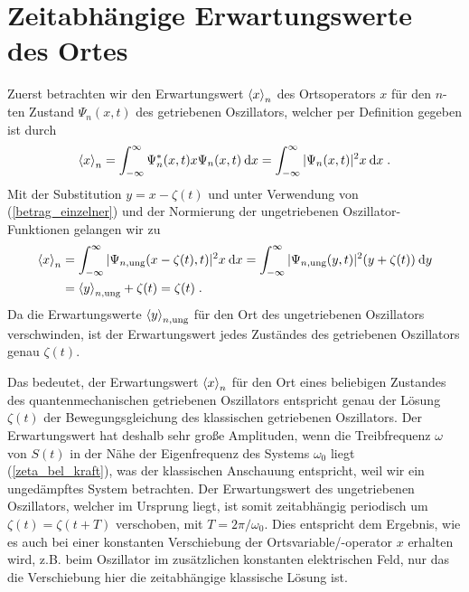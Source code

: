   \section{Zeitabhängige Erwartungswerte des Ortes}
    Zuerst betrachten wir den Erwartungswert $\braket{x}_n$ des Ortsoperators $x$ für den $n$-ten Zustand $\Psi_n(x,t)$ des getriebenen Oszillators, welcher per Definition gegeben ist durch
    \begin{equation}
      \braket{x}_n = \int_{-\infty}^{\infty} \Psi_n^*(x,t)x\Psi_n(x,t) \: \text dx
      = \int_{-\infty}^{\infty} |\Psi_n(x,t)|^2 x \: \text dx \; .
    \end{equation}
    Mit der Substitution $y=x-\zeta(t)$ und unter Verwendung von (\ref{betrag_einzelner}) und der Normierung der ungetriebenen Oszillator-Funktionen gelangen wir zu
    \begin{align}
      \begin{split}
        \braket{x}_n &= \int_{-\infty}^{\infty} |\Psi_{n,\text{ung}}(x-\zeta(t),t)|^2 x \: \text dx
        = \int_{-\infty}^{\infty} |\Psi_{n,\text{ung}}(y,t)|^2 (y+\zeta(t)) \: \text dy \\
        &= \braket{y}_{n,\text{ung}} + \zeta(t) = \zeta(t) \; .
        \label{erwartungswert_x_einzelner}
      \end{split}
    \end{align}
    Da die Erwartungswerte $\braket{y}_{n,\text{ung}}$ für den Ort des ungetriebenen Oszillators verschwinden, ist der Erwartungswert jedes Zuständes des getriebenen Oszillators genau $\zeta(t)$.

    Das bedeutet, der Erwartungswert $\braket{x}_n$ für den Ort eines beliebigen Zustandes des quantenmechanischen getriebenen Oszillators entspricht genau der Lösung $\zeta(t)$ der Bewegungsgleichung des klassischen getriebenen Oszillators.
    Der Erwartungswert hat deshalb sehr große Amplituden, wenn die Treibfrequenz $\omega$ von $S(t)$ in der Nähe der Eigenfrequenz des Systems $\omega_0$ liegt (\ref{zeta_bel_kraft}), was der klassischen Anschauung entspricht, weil wir ein ungedämpftes System betrachten.
    Der Erwartungswert des ungetriebenen Oszillators, welcher im Ursprung liegt, ist somit zeitabhängig periodisch um $\zeta(t)=\zeta(t+T)$ verschoben, mit $T=2\pi/\omega_0$.
    Dies entspricht dem Ergebnis, wie es auch bei einer konstanten Verschiebung der Ortsvariable/-operator $x$ erhalten wird, z.B. beim Oszillator im zusätzlichen konstanten elektrischen Feld, nur das die Verschiebung hier die zeitabhängige klassische Lösung ist.

